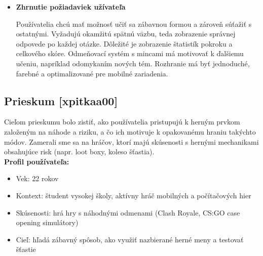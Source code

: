 \documentclass[a4paper,12pt]{article}
\begin{document}
\begin{itemize}
	      \textit{4. Užívateľské rozhranie a prehľad:}  
	      \begin{itemize}
	      	\item Ako by mal vyzerať hlavný panel – chceš vidieť svoj celkový progres, posledné hry alebo tipy na témy?
	      	\item Chcel by si, aby aplikácia pôsobila skôr ako hra (farebná, animovaná) alebo ako seriózny vzdelávací nástroj?
	      	\item Používaš častejšie mobil alebo počítač na učenie?
	      \end{itemize}

	\item \textbf{Zhrnutie požiadaviek užívateľa}  

	      Používatelia chcú mať možnosť učiť sa zábavnou formou a zároveň súťažiť s ostatnými. Vyžadujú okamžitú spätnú väzbu, teda zobrazenie správnej odpovede po každej otázke. Dôležité je zobrazenie štatistík pokroku a celkového skóre. Odmeňovací systém s mincami má motivovať k ďalšiemu učeniu, napríklad odomykaním nových tém. Rozhranie má byť jednoduché, farebné a optimalizované pre mobilné zariadenia.
\end{itemize}

    	
    	
    	\subsection{Prieskum [xpitkaa00]}
    	Cieľom prieskumu bolo zistiť, ako používatelia pristupujú k herným prvkom založeným na náhode a riziku, a čo ich motivuje k opakovanému hraniu takýchto módov. Zamerali sme sa na hráčov, ktorí majú skúsenosti s hernými mechanikami obsahujúce risk (napr. loot boxy, koleso šťastia).
    	\\
    	
    	\textbf{Profil používateľa:}
    	\renewcommand{\labelitemi}{$\bullet$}
    	\renewcommand{\labelitemii}{$\bullet$}
    	\renewcommand{\labelitemiii}{$\bullet$}
    	\renewcommand{\labelitemiv}{$\bullet$}
    	\begin{itemize}
    	    \item Vek: 22 rokov
    	    \item Kontext: študent vysokej školy, aktívny hráč mobilných a počítačových hier
    	    \item Skúsenosti: hrá hry s náhodnými odmenami (Clash Royale, CS:GO case opening simulátory)
    	    \item Cieľ: hľadá zábavný spôsob, ako využiť nazbierané herné meny a testovať šťastie
    	\end{itemize}
    	
\end{document}
